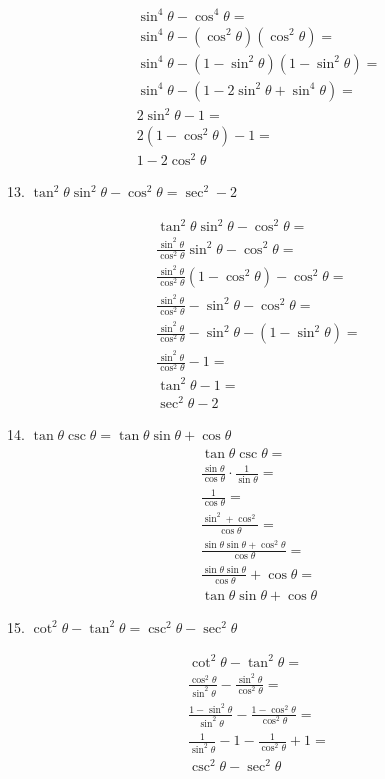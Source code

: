 \documentclass[]{report}
\begin{document}
\begin{align*}
\sin^4\theta - \cos^4\theta  = \\
\sin^4\theta - (\cos^2\theta)(\cos^2\theta) = \\
\sin^4\theta - (1 - \sin^2\theta)(1-\sin^2\theta) = \\
\sin^4\theta - (1 - 2\sin^2\theta + \sin^4\theta) = \\
2\sin^2\theta - 1 = \\
2(1 - \cos^2\theta) - 1 = \\
1 - 2\cos^2\theta
\end{align*}

13. $\tan^2\theta\sin^2\theta - \cos^2\theta = \sec^2 - 2$

\begin{align*}
\tan^2\theta\sin^2\theta - \cos^2\theta = \\
\frac{\sin^2\theta}{\cos^2\theta}\sin^2\theta - \cos^2\theta = \\
\frac{\sin^2\theta}{\cos^2\theta}(1-\cos^2\theta) - \cos^2\theta = \\
\frac{\sin^2\theta}{\cos^2\theta} -\sin^2\theta - \cos^2\theta = \\
\frac{\sin^2\theta}{\cos^2\theta} -\sin^2\theta - (1 - \sin^2\theta) = \\
\frac{\sin^2\theta}{\cos^2\theta} - 1 = \\
\tan^2\theta - 1 = \\
\sec^2\theta - 2
\end{align*}

14. $\tan\theta\csc\theta = \tan\theta\sin\theta+\cos\theta$
\begin{align*}
\tan\theta\csc\theta = \\
\frac{\sin\theta}{\cos\theta} \cdot \frac{1}{\sin\theta} = \\
\frac{1}{\cos\theta} = \\
\frac{\sin^2 + \cos^2}{\cos \theta} = \\
\frac{\sin\theta\sin\theta+ \cos^2\theta}{\cos\theta} = \\
\frac{\sin\theta\sin\theta}{\cos\theta} + \cos\theta = \\
\tan\theta\sin\theta + \cos\theta
\end{align*}

15. $\cot^2\theta - \tan^2\theta = \csc^2\theta - \sec^2\theta$

\begin{align*}
\cot^2\theta - \tan^2\theta = \\
\frac{\cos^2\theta}{\sin^2\theta} - \frac{\sin^2\theta}{\cos^2\theta} = \\
\frac{1 - \sin^2\theta}{\sin^2\theta} - \frac{1 - \cos^2\theta}{\cos^2\theta} = \\ 
\frac{1}{\sin^2\theta} - 1 - \frac{1}{\cos^2\theta} + 1 = \\
\csc^2\theta  - \sec^2\theta 
\end{align*}
\end{document}
